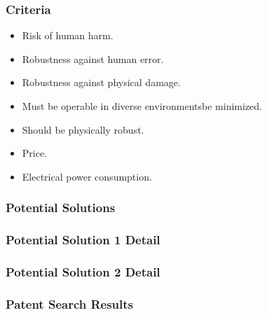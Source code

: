 \documentclass{beamer}
\begin{document}
\begin{frame}
  \frametitle{Criteria}
  \begin{itemize}
    \item Risk of human harm.\\
    \item Robustness against human error.\\
    \item Robustness against physical damage.\\
    \item Must be operable in diverse environmentsbe minimized. \\
    \item Should be physically robust. \\
    \item Price.\\
    \item Electrical power consumption.\\
  \end{itemize}
\end{frame}

\begin{frame}
  \frametitle{Potential Solutions}
\end{frame}

\begin{frame}
  \frametitle{Potential Solution 1 Detail}
\end{frame}

\begin{frame}
  \frametitle{Potential Solution 2 Detail}
\end{frame}

\begin{frame}
  \frametitle{Patent Search Results}
\end{frame}
\end{document}
